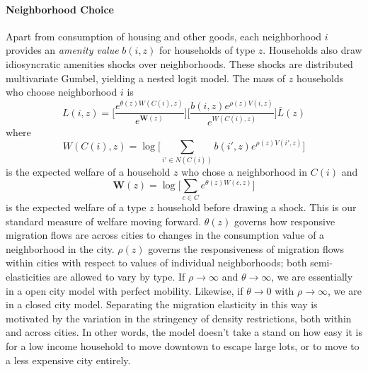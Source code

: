 \documentclass[]{article}
\begin{document}
\paragraph*{Neighborhood Choice} 
Apart from consumption of housing and other goods, each neighborhood $i$ provides an \textit{amenity value} $b(i, z)$ for households of type $z$. Households also draw idiosyncratic amenities shocks over neighborhoods. These shocks are distributed multivariate Gumbel, yielding a nested logit model. The mass of $z$ households who choose neighborhood $i$ is 
\begin{equation}\label{laboursupply}
	L(i, z) = \bigg[\frac{e^{\theta(z) W(C(i), z)}}{e^{\boldsymbol{W}(z)}}\bigg]\bigg[\frac{b(i, z)e^{\rho(z) V(i, z)}}{e^{W(C(i), z)}}\bigg]\bar{L}(z)
\end{equation}
 where 
 \begin{equation}
 	W(C(i), z) = \log\bigg[\sum_{i' \in N(C(i))}b(i', z)e^{\rho(z) V(i', z)}\bigg]
 \end{equation} 
is the expected welfare of a household $z$ who chose a neighborhood in $C(i)$ and 
\begin{equation}\label{expwelfare}
\boldsymbol{W}(z) = \log\bigg[\sum_{c \in C} e^{\theta(z) W(c, z)}\bigg]
\end{equation}
is the expected welfare of a type $z$ household before drawing a shock. This is our standard measure of welfare moving forward. $\theta(z)$ governs how responsive migration flows are across cities to changes in the consumption value of a neighborhood in the city. $\rho(z)$ governs the responsiveness of migration flows within cities with respect to values of individual neighborhoods; both semi-elasticities are allowed to vary by type. If $\rho \to \infty$ and $\theta \to \infty$, we are essentially in a open city model with perfect mobility. Likewise, if $\theta \to 0$ with $\rho \to \infty$, we are in a closed city model. Separating the migration elasticity in this way is motivated by the variation in the stringency of density restrictions, both within and across cities. In other words, the model doesn't take a stand on how easy it is for a low income household to move downtown to escape large lots, or to move to a less expensive city entirely.  

 
\end{document}
